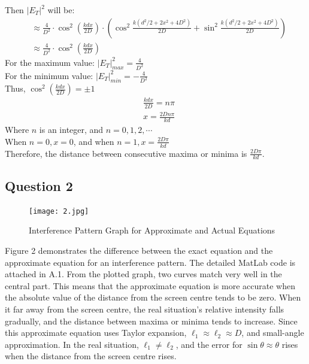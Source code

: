 \documentclass[12pt]{article}
\begin{document}
    Then $|E_T|^2$ will be:
    \begin{align}
                    &\approx \frac{4}{D^2} \cdot \cos^2 (\frac{kdx}{2D}) \cdot \left( \cos^2\frac{k(d^2/2 + 2x^2 + 4D^2)}{2D} + \sin^2\frac{k(d^2/2 + 2x^2 + 4D^2)}{2D} \right) \\
                    &\approx \frac{4}{D^2} \cdot \cos^2 (\frac{kdx}{2D})
    \end{align}
    For the maximum value: $|E_T|^2_{max}=\frac{4}{D^2}$\\
    For the minimum value: $|E_T|^2_{min}=-\frac{4}{D^2}$\\
    Thus, $\cos^2 (\frac{kdx}{2D})=\pm 1$
    \begin{align}
    &\frac{kdx}{2D}=n\pi\\
    &x=\frac{2Dn\pi}{kd}
    \end{align}
    Where $n$ is an integer, and $n=0,1,2,\cdots$\\
    When $n=0,x=0$, and    when $n=1,x=\frac{2D\pi}{kd}$\\
    Therefore, the distance between consecutive maxima or minima is $\frac{2D\pi}{kd}$.
    
    \subsection{Question 2}
    \paragraph{}
    \begin{figure}[H]
    \centering
    \texttt{[image: 2.jpg]}
    \caption{Interference Pattern Graph for Approximate and Actual Equations}
    \end{figure}
    Figure 2 demonstrates the difference between the exact equation and the approximate equation for an interference pattern. The detailed MatLab code is attached in A.1. From the plotted graph, two curves match very well in the central part. This means that the approximate equation is more accurate when the absolute value of the distance from the screen centre tends to be zero. When it far away from the screen centre, the real situation's relative intensity falls gradually, and the distance between maxima or minima tends to increase. Since this approximate equation uses Taylor expansion, $\ell_{1}\approx\ell_{2}\approx D$, and small-angle approximation. In the real situation, $\ell_{1}\neq\ell_{2}$, and the error for $\sin{\theta}\approx\theta$ rises when the distance from the screen centre rises.
    
\end{document}
